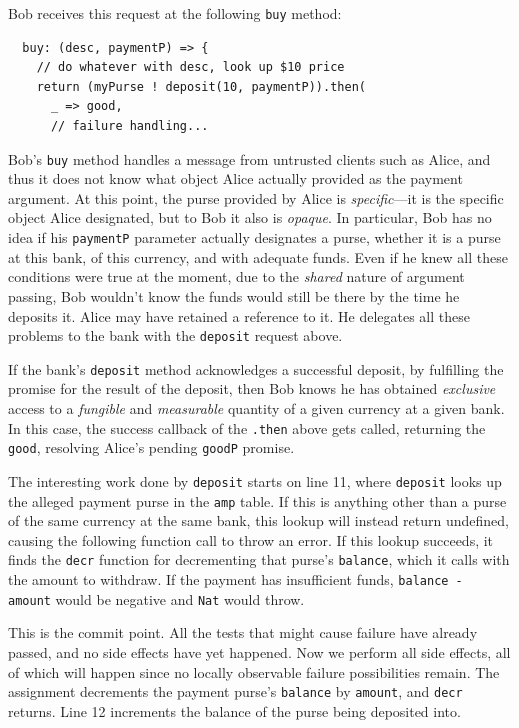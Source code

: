 \documentclass{llncs}
\begin{document}
Bob receives this request at the following {\tt buy} method:

\begin{verbatim}
  buy: (desc, paymentP) => {
    // do whatever with desc, look up $10 price
    return (myPurse ! deposit(10, paymentP)).then(
      _ => good,
      // failure handling...
\end{verbatim}

Bob's {\tt buy} method handles a message from untrusted clients such as Alice, and thus it does not know what object Alice actually provided as the payment argument. At this point, the purse provided by Alice is \emph{specific}---it is the specific object Alice designated, but to Bob it also is \emph{opaque}. In particular, Bob has no idea if his {\tt paymentP} parameter actually designates a purse, whether it is a purse at this bank, of this currency, and with adequate funds. Even if he knew all these conditions were true at the moment, due to the \emph{shared} nature of argument passing, Bob wouldn't know the funds would still be there by the time he deposits it. Alice may have retained a reference to it. He delegates all these problems to the bank with the {\tt deposit} request above. 

If the bank's {\tt deposit} method acknowledges a successful deposit, by fulfilling the promise for the result of the deposit, then Bob knows he has obtained \emph{exclusive} access to a \emph{fungible} and \emph{measurable} quantity of a given currency at a given bank. In this case, the success callback of the {\tt .then} above gets called, returning the {\tt good}, resolving Alice's pending {\tt goodP} promise.

The interesting work done by {\tt deposit} starts on line 11, where {\tt deposit} looks up the alleged payment purse in the {\tt amp} table. If this is anything other than a purse of the same currency at the same bank, this lookup will instead return undefined, causing the following function call to throw an error. If this lookup succeeds, it finds the {\tt decr} function for decrementing that purse's {\tt balance}, which it calls with the amount to withdraw. If the payment has insufficient funds, {\tt balance - amount} would be negative and {\tt Nat} would throw.

This is the commit point. All the tests that might cause failure have already passed, and no side effects have yet happened. Now we perform all side effects, all of which will happen since no locally observable failure possibilities remain. The assignment decrements the payment purse's {\tt balance} by {\tt amount}, and {\tt decr} returns. Line 12 increments the balance of the purse being deposited into.
\end{document}
